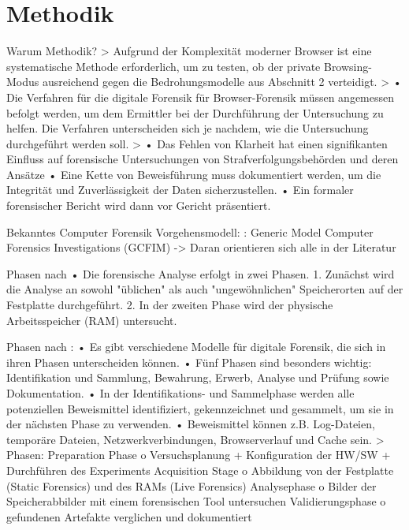 \chapter{Methodik}

Warum Methodik? 
	> \cite{Aggarwal.2010}
		Aufgrund der Komplexität moderner Browser ist eine systematische Methode erforderlich, um zu testen, ob der private Browsing-Modus ausreichend gegen die Bedrohungsmodelle aus Abschnitt 2 verteidigt.		
	> \cite{Izzati.2022}
		•	Die Verfahren für die digitale Forensik für Browser-Forensik müssen angemessen befolgt werden, um dem Ermittler bei der Durchführung der Untersuchung zu helfen. Die Verfahren unterscheiden sich je nachdem, wie die Untersuchung durchgeführt werden soll.
	> \cite{Horsman.2019}
		•	Das Fehlen von Klarheit hat einen signifikanten Einfluss auf forensische Untersuchungen von Strafverfolgungsbehörden und deren Ansätze
		•	Eine Kette von Beweisführung muss dokumentiert werden, um die Integrität und Zuverlässigkeit der Daten sicherzustellen.
		•	Ein formaler forensischer Bericht wird dann vor Gericht präsentiert.
	
	
Bekanntes Computer Forensik Vorgehensmodell: \cite{Yusoff.2011}: Generic Model Computer Forensics Investigations (GCFIM) -> Daran orientieren sich alle in der Literatur


Phasen nach \cite{Montasari.2015}
	•	Die forensische Analyse erfolgt in zwei Phasen.
	1.	Zunächst wird die Analyse an sowohl "üblichen" als auch "ungewöhnlichen" Speicherorten auf der Festplatte durchgeführt.
	2.	In der zweiten Phase wird der physische Arbeitsspeicher (RAM) untersucht.


Phasen nach \cite{Izzati.2022}:
	•	Es gibt verschiedene Modelle für digitale Forensik, die sich in ihren Phasen unterscheiden können.
	•	Fünf Phasen sind besonders wichtig: Identifikation und Sammlung, Bewahrung, Erwerb, Analyse und Prüfung sowie Dokumentation.
	•	In der Identifikations- und Sammelphase werden alle potenziellen Beweismittel identifiziert, gekennzeichnet und gesammelt, um sie in der nächsten Phase zu verwenden.
	•	Beweismittel können z.B. Log-Dateien, temporäre Dateien, Netzwerkverbindungen, Browserverlauf und Cache sein.
	> Phasen:
		Preparation Phase
		o	Versuchsplanung + Konfiguration der HW/SW + Durchführen des Experiments Acquisition Stage
		o	Abbildung von der Festplatte (Static Forensics) und des RAMs (Live Forensics) Analysephase
		o	Bilder der Speicherabbilder mit einem forensischen Tool untersuchen	Validierungsphase
		o	gefundenen Artefakte verglichen und dokumentiert



